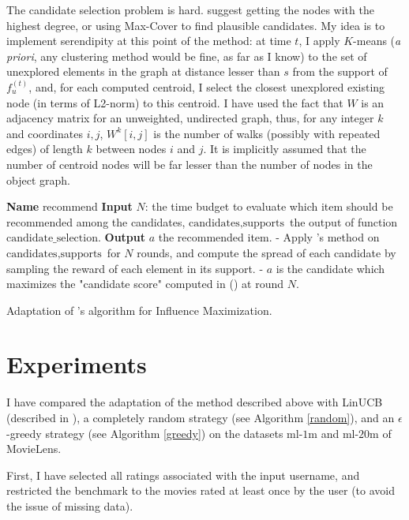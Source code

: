 \documentclass{article}
\begin{document}
The candidate selection problem is hard. \citet{lagree2017effective} suggest getting the nodes with the highest degree, or using Max-Cover to find plausible candidates. My idea is to implement serendipity at this point of the method: at time $t$, I apply $K$-means (\emph{a priori}, any clustering method would be fine, as far as I know) to the set of unexplored elements in the graph at distance lesser than $s$ from the support of $f^{(t)}_{u}$, and, for each computed centroid, I select the closest unexplored existing node (in terms of L2-norm) to this centroid. I have used the fact that $W$ is an adjacency matrix for an unweighted, undirected graph, thus, for any integer $k$ and coordinates $i, j$, $W^{k}[i,j]$ is the number of walks (possibly with repeated edges) of length $k$ between nodes $i$ and $j$. It is implicitly assumed that the number of centroid nodes will be far lesser than the number of nodes in the object graph. 

\begin{algorithm}
\begin{algorithmic}
\STATE \textbf{Name} recommend
\STATE \textbf{Input} $N$: the time budget to evaluate which item should be recommended among the candidates, $\text{candidates}, \text{supports}$ the output of function $\text{candidate\_selection}$.
\STATE \textbf{Output} $a$ the recommended item.
\STATE - Apply \cite{lagree2017effective}'s method on $\text{candidates}, \text{supports}$ for $N$ rounds, and compute the spread of each candidate by sampling the reward of each element in its support.
\STATE - $a$ is the candidate which maximizes the "candidate score" computed in (\cite{lagree2017effective}) at round $N$.
\end{algorithmic}
\caption{Adaptation of \cite{lagree2017effective}'s algorithm for Influence Maximization.}
\label{lagree}
\end{algorithm}

\section{Experiments}

I have compared the adaptation of the method described above with LinUCB (described in \cite{chu2011contextual}), a completely random strategy (see Algorithm \ref{random}), and an $\epsilon$-greedy strategy (see Algorithm \ref{greedy}) on the datasets $\text{ml-1m}$ and $\text{ml-20m}$ of MovieLens. 

First, I have selected all ratings associated with the input username, and restricted the benchmark to the movies rated at least once by the user (to avoid the issue of missing data).
\end{document}

